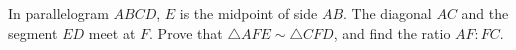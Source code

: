In parallelogram $ABCD$, $E$ is the midpoint of side $AB$. The diagonal $AC$ and the segment $ED$ meet at $F$. Prove that $\triangle AFE\sim\triangle CFD$, and find the ratio $AF:FC$.

